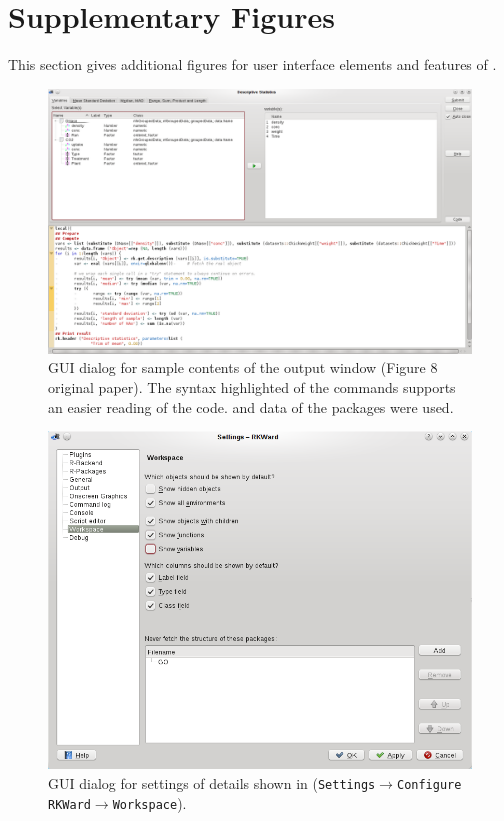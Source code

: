 \section{Supplementary Figures}
\label{sec:Supplementary_figures}
This section gives additional figures for user interface elements and features of .

\begin{figure}[!h]
 \centering
 \includegraphics[width=15.4cm]{./figures/figure8_supplement.png}
 \caption{GUI dialog for sample contents of the output window (Figure 8 original paper). The syntax highlighted of the commands supports an easier reading of the code.
  and  data of the  packages were used.}
 \label{fig:figure8_supplement}
\end{figure}

\begin{figure}[!h]
 \centering
 \includegraphics[width=15.4cm]{./figures/settings.png}
 \caption{GUI dialog for settings of details shown in  (\texttt{Settings$\rightarrow$Configure RKWard$\rightarrow$Workspace}).}
 \label{fig:settings}
\end{figure}